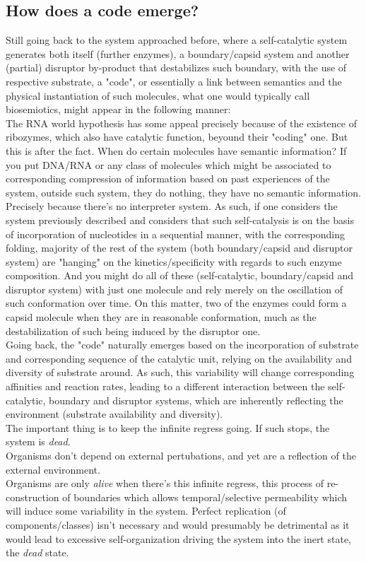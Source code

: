 \documentclass[a4paper,12pt,twoside,leqno]{article}
\begin{document}
\subsection*{How does a code emerge?}
Still going back to the system approached before, where a self-catalytic system generates both itself (further enzymes), a boundary/capsid system and another (partial) disruptor by-product that destabilizes such boundary, with the use of respective substrate, a "code", or essentially a link between semantics and the physical instantiation of such molecules, what one would typically call biosemiotics, might appear in the following manner:\\
The RNA world hypothesis has some appeal precisely because of the existence of ribozymes, which also have catalytic function, beyound their "coding" one. But this is after the fact. When do certain molecules have semantic information? If you put DNA/RNA or any class of molecules which might be associated to corresponding compression of information based on past experiences of the system, outside such system, they do nothing, they have no semantic information. Precisely because there's no interpreter system. As such, if one considers the system previously described and considers that such self-catalysis is on the basis of incorporation of nucleotides in a sequential manner, with the corresponding folding, majority of the rest of the system (both boundary/capsid and disruptor system) are "hanging" on the kinetics/specificity with regards to such enzyme composition. And you might do all of these (self-catalytic, boundary/capsid and disruptor system) with just one molecule and rely merely on the oscillation of such conformation over time. On this matter, two of the enzymes could form a capsid molecule when they are in reasonable conformation, much as the destabilization of such being induced by the disruptor one.\\
Going back, the "code" naturally emerges based on the incorporation of substrate and corresponding sequence of the catalytic unit, relying on the availability and diversity of substrate around. As such, this variability will change corresponding affinities and reaction rates, leading to a different interaction between the self-catalytic, boundary and disruptor systems, which are inherently reflecting the environment (substrate availability and diversity).\\
The important thing is to keep the infinite regress going. If such stops, the system is \textit{dead}.\\
Organisms don't depend on external pertubations, and yet are a reflection of the external environment.\\
Organisms are only \textit{alive} when there's this infinite regress, this process of re-construction of boundaries which allows temporal/selective permeability which will induce some variability in the system. Perfect replication (of components/classes) isn't necessary and would presumably be detrimental as it would lead to excessive self-organization driving the system into the inert state, the \textit{dead} state. 
\end{document}
